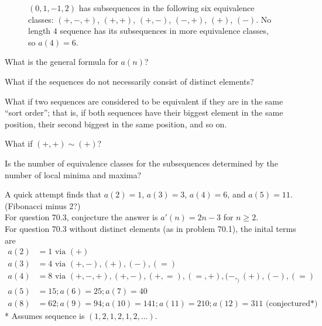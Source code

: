 \documentclass{article}
\begin{document}
\begin{figure}[!h]
\hspace{0.5cm}
  \caption{
    $(0, 1, -1, 2)$ has subsequences in the following six equivalence classes:
    $(+, -, +)$, $(+, +)$, $(+, -)$, $(-, +)$, $(+)$, $(-)$. No length $4$
    sequence has its subsequences in more equivalence classes, so $a(4) = 6$.
  }
\end{figure}

\begin{question}
  What is the general formula for $a(n)$?
\end{question}
\begin{related}
  \item What if the sequences do not necessarily consist of distinct elements?
  \item What if two sequences are considered to be equivalent if they are in the
    same ``sort order''; that is, if both sequences have their biggest element
    in the same position, their second biggest in the same position, and so on.
  \item What if $(+, +) \sim (+)$?
  \item Is the number of equivalence classes for the subsequences determined by
   the number of local minima and maxima?
\end{related}

\begin{note}
  A quick attempt finds that $a(2) = 1$, $a(3) = 3$, $a(4)=6$, and $a(5)=11$.
  (Fibonacci minus 2?)\\
  For question 70.3, conjecture the answer is $a'(n) = 2n - 3$ for $n \geq 2$.\\
  For question 70.3 without distinct elements (as in problem 70.1), the inital terms are
  \begin{align*}
    a(2) &= 1 \text { via } (+)  \\
    a(3) &= 4 \text { via } (+, -), (+), (-), (=)  \\
    a(4) &= 8 \text { via } (+, -, +), (+, -), (+, =), (=, +), (-, _) (+), (-), (=)  \\
    a(5) &= 15; a(6) = 25; a(7) = 40\\
    a(8) &= 62; a(9) = 94; a(10) = 141; a(11) = 210; a(12) = 311 \text{ (conjectured*)}
  \end{align*}
  * Assumes sequence is $(1,2,1,2,1,2,\hdots)$.
\end{note}
\end{document}
